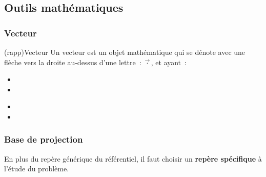 \documentclass[../../main/main.tex]{subfiles}
\begin{document}
\subsection{Outils mathématiques}
\subsubsection{Vecteur}


\begin{tcb}(rapp){Vecteur}
	Un vecteur est un objet mathématique qui se dénote avec une flèche vers la
	droite au-dessus d'une lettre~: $\vec{\cdot}$, et ayant~:\smallbreak
	\begin{minipage}{0.40\linewidth}
		\begin{itemize}
			\item
			\item
		\end{itemize}
	\end{minipage}
	\begin{minipage}{0.50\linewidth}
		\begin{itemize}
			\item
			\item
		\end{itemize}
	\end{minipage}
	\begin{framed}
		\centering
	\end{framed}
\end{tcb}

\subsubsection{Base de projection}

En plus du repère générique du référentiel, il faut choisir un
\textbf{repère spécifique} à l'étude du problème.
\end{document}
